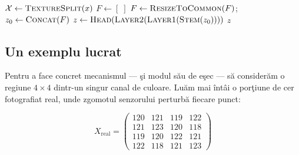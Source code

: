 \begin{algorithm}[t]
\caption{Trecerea înainte MLEP (generalizată; modelul publicat este cazul
$\mathcal{W}=\{2\}$, $\mathcal{M}=\{\text{shannon}\}$, fără separare de texturi)}
\label{alg:mlep}
\BlankLine
$\mathcal{X} \leftarrow \textsc{TextureSplit}(x)$ 
$F \leftarrow [\;]$\;
$F \leftarrow \textsc{ResizeToCommon}(F)$;\quad $z_0 \leftarrow \textsc{Concat}(F)$ 
$z \leftarrow \textsc{Head}(\textsc{Layer2}(\textsc{Layer1}(\textsc{Stem}(z_0))))$\;
\Return $z$\;
\end{algorithm}

\subsection{Un exemplu lucrat}
\label{sec:worked-example}

Pentru a face concret mecanismul --- şi modul său de eşec --- să considerăm o
regiune $4\times4$ dintr-un singur canal de culoare. Luăm mai întâi o porţiune
de cer fotografiat real, unde zgomotul senzorului perturbă fiecare punct:

\[
X_{\text{real}} =
\begin{pmatrix}
120 & 121 & 119 & 122\\
121 & 123 & 120 & 118\\
119 & 120 & 122 & 121\\
122 & 118 & 121 & 123
\end{pmatrix}
\]

